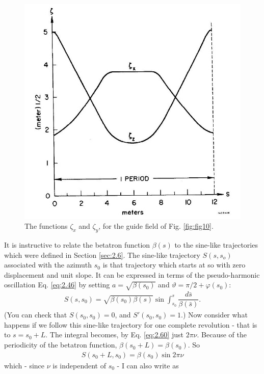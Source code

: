 \begin{figure}[!htb]
	\centering
	\includegraphics[width=0.8\linewidth]{./Figuras/fig18.jpeg}
	\caption{The functions $\zeta_x$ and $\zeta_y$, for the guide field of Fig. \ref{fig:fig10}.}
	\label{fig:fig18}
\end{figure}

It is instructive to relate the betatron function $\beta(s)$ to the sine-like trajectories which were defined in Section \ref{sec:2.6}. The sine-like trajectory $S(s, s_o)$ associated with the azimuth $s_0$ is that trajectory which starts at so with zero displacement
and unit slope. It can be expressed in terms of the pseudo-harmonic oscillation Eq. \eqref{eq:2.46} by setting $a = \sqrt{\beta(s_0)}$ and $\vartheta = \pi/2+\varphi(s_0)$:
\begin{align}
	S(s,s_0) = \sqrt{\beta(s_0)\beta(s)}\sin\int_{s_0}^s\dfrac{d\bar{s}}{\beta(\bar{s})}.
\end{align}
(You can check that $S(s_0, s_0) = 0$, and $S'(s_0, s_0) = 1$.) Now consider what happens if we follow this sine-like trajectory for one complete revolution - that is to $s = s_0 + L$. The integral becomes, by Eq. \eqref{eq:2.60} just $2\pi\nu$. Because of the periodicity of the betatron function, $\beta(s_0 + L) = \beta(s_0)$. So
\begin{align}
	S(s_0+L,s_0)=\beta(s_0)\sin2\pi\nu
\end{align}
which - since $\nu$ is independent of $s_0$ - I can also write as

